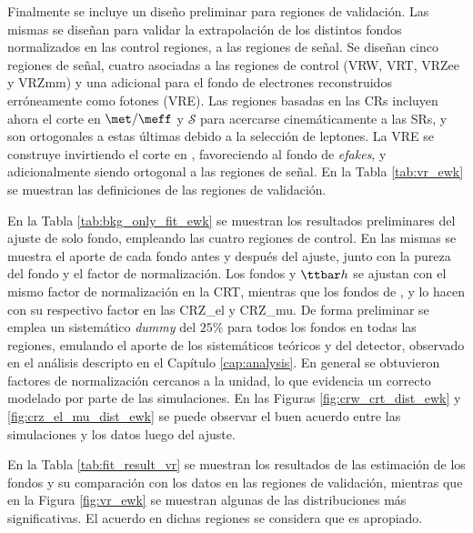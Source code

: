 Finalmente se incluye un diseño preliminar para regiones de validación. Las mismas se diseñan para validar la extrapolación de los distintos fondos normalizados en las control regiones, a las regiones de señal. Se diseñan cinco regiones de señal, cuatro asociadas a las regiones de control (VRW, VRT, VRZee y VRZmm) y una adicional para el fondo de electrones reconstruidos erróneamente como fotones (VRE). Las regiones basadas en las CRs incluyen ahora el corte en $\met/\meff$ y $\mathcal{S}$ para acercarse cinemáticamente a las SRs, y son ortogonales a estas últimas debido a la selección de leptones. La VRE se construye invirtiendo el corte en \dphigammet, favoreciendo al fondo de \textit{efakes}, y adicionalmente siendo ortogonal a las regiones de señal. En la Tabla \ref{tab:vr_ewk} se muestran las definiciones de las regiones de validación.





En la Tabla \ref{tab:bkg_only_fit_ewk} se muestran los resultados preliminares del ajuste de solo fondo, empleando las cuatro regiones de control. En las mismas se muestra el aporte de cada fondo antes y después del ajuste, junto con la pureza del fondo y el factor de normalización. Los fondos \ttbarph y $\ttbar h$ se ajustan con el mismo factor de normalización en la CRT, mientras que los fondos de \znunuph, \zeeph y \zmumuph lo hacen con su respectivo factor en las CRZ\_el y CRZ\_mu. De forma preliminar se emplea un sistemático \textit{dummy} del $25\%$ para todos los fondos en todas las regiones, emulando el aporte de los sistemáticos teóricos y del detector, observado en el análisis descripto en el Capítulo \ref{cap:analysis}. En general se obtuvieron factores de normalización cercanos a la unidad, lo que evidencia un correcto modelado por parte de las simulaciones. En las Figuras \ref{fig:crw_crt_dist_ewk} y \ref{fig:crz_el_mu_dist_ewk} se puede observar el buen acuerdo entre las simulaciones y los datos luego del ajuste.





En la Tabla \ref{tab:fit_result_vr} se muestran los resultados de las estimación de los fondos y su comparación con los datos en las regiones de validación, mientras que en la Figura \ref{fig:vr_ewk} se muestran algunas de las distribuciones más significativas. El acuerdo en dichas regiones se considera que es apropiado. 


